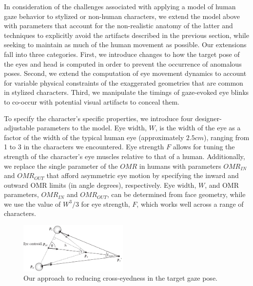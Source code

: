 In consideration of the challenges associated with applying a model of human gaze behavior to stylized or non-human characters, we extend the model above with parameters that account for the non-realistic anatomy of the latter and techniques to explicitly avoid the artifacts described in the previous section, while seeking to maintain as much of the human movement as possible.
Our extensions fall into three categories.
First, we introduce changes to how the target pose of the eyes and head is computed in order to prevent the occurrence of anomalous poses. Second, we extend the computation of eye movement dynamics to account for variable physical constraints of the exaggerated geometries that are common in stylized characters. Third, we manipulate the timings of gaze-evoked eye blinks to co-occur with potential visual artifacts to conceal them.

To specify the character's specific properties, we introduce four designer-adjustable parameters to the model. Eye width, $W$, is the width of the eye as a factor of the width of the typical human eye (approximately $2.5 cm$), ranging from 1 to 3 in the characters we encountered. Eye strength $F$ allows for tuning the strength of the character's eye muscles relative to that of a human. Additionally, we replace the single parameter of the $OMR$ in humans with parameters $OMR_{IN}$ and $OMR_{OUT}$ that afford asymmetric eye motion by specifying the inward and outward OMR limits (in angle degrees), respectively. Eye width, $W$, and OMR parameters, $OMR_{IN}$ and $OMR_{OUT}$, can be determined from face geometry, while we use the value of $W^3/3$ for eye strength, $F$, which works well across a range of characters.

\begin{figure}[b]
\centering
\vspace{-6pt}
\includegraphics[width=0.48\textwidth]{Figures/CrosseyednessRemoval.pdf}
\caption{Our approach to reducing cross-eyedness in the target gaze pose.}
\vspace{-6pt}
\label{fig:CrosseyednessRemoval}
\end{figure}

